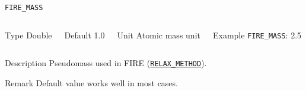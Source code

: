 \documentclass[xcolor=dvipsnames,t]{beamer}
\begin{document}
\begin{frame}[allowframebreaks]{\texttt{FIRE\_MASS}} \label{FIRE_MASS}
\vspace*{-12pt}
\begin{columns}
\begin{block}{Type}
Double
\end{block}

\begin{block}{Default}
1.0
\end{block}

\begin{block}{Unit}
Atomic mass unit
\end{block}

\begin{block}{Example}
\texttt{FIRE\_MASS}: 2.5
\end{block}
\end{columns}

\begin{block}{Description}
Pseudomass used in FIRE (\hyperlink{RELAX_METHOD}{\texttt{RELAX\_METHOD}}).
\end{block}

\begin{block}{Remark}
Default value works well in most cases.
\end{block}

\end{frame}
\end{document}
